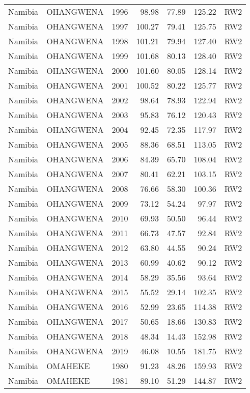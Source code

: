 \begin{longtable}{lllrrrl}
  Namibia & OHANGWENA & 1996 & 98.98 & 77.89 & 125.22 & RW2 \\ 
  Namibia & OHANGWENA & 1997 & 100.27 & 79.41 & 125.75 & RW2 \\ 
  Namibia & OHANGWENA & 1998 & 101.21 & 79.94 & 127.40 & RW2 \\ 
  Namibia & OHANGWENA & 1999 & 101.68 & 80.13 & 128.40 & RW2 \\ 
  Namibia & OHANGWENA & 2000 & 101.60 & 80.05 & 128.14 & RW2 \\ 
  Namibia & OHANGWENA & 2001 & 100.52 & 80.22 & 125.77 & RW2 \\ 
  Namibia & OHANGWENA & 2002 & 98.64 & 78.93 & 122.94 & RW2 \\ 
  Namibia & OHANGWENA & 2003 & 95.83 & 76.12 & 120.43 & RW2 \\ 
  Namibia & OHANGWENA & 2004 & 92.45 & 72.35 & 117.97 & RW2 \\ 
  Namibia & OHANGWENA & 2005 & 88.36 & 68.51 & 113.05 & RW2 \\ 
  Namibia & OHANGWENA & 2006 & 84.39 & 65.70 & 108.04 & RW2 \\ 
  Namibia & OHANGWENA & 2007 & 80.41 & 62.21 & 103.15 & RW2 \\ 
  Namibia & OHANGWENA & 2008 & 76.66 & 58.30 & 100.36 & RW2 \\ 
  Namibia & OHANGWENA & 2009 & 73.12 & 54.24 & 97.97 & RW2 \\ 
  Namibia & OHANGWENA & 2010 & 69.93 & 50.50 & 96.44 & RW2 \\ 
  Namibia & OHANGWENA & 2011 & 66.73 & 47.57 & 92.84 & RW2 \\ 
  Namibia & OHANGWENA & 2012 & 63.80 & 44.55 & 90.24 & RW2 \\ 
  Namibia & OHANGWENA & 2013 & 60.99 & 40.62 & 90.12 & RW2 \\ 
  Namibia & OHANGWENA & 2014 & 58.29 & 35.56 & 93.64 & RW2 \\ 
  Namibia & OHANGWENA & 2015 & 55.52 & 29.14 & 102.35 & RW2 \\ 
  Namibia & OHANGWENA & 2016 & 52.99 & 23.65 & 114.38 & RW2 \\ 
  Namibia & OHANGWENA & 2017 & 50.65 & 18.66 & 130.83 & RW2 \\ 
  Namibia & OHANGWENA & 2018 & 48.34 & 14.43 & 152.98 & RW2 \\ 
  Namibia & OHANGWENA & 2019 & 46.08 & 10.55 & 181.75 & RW2 \\ 
  Namibia & OMAHEKE & 1980 & 91.23 & 48.26 & 159.93 & RW2 \\ 
  Namibia & OMAHEKE & 1981 & 89.10 & 51.29 & 144.87 & RW2 \\ 

\end{longtable}
